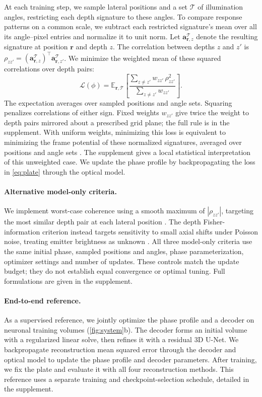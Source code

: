 At each training step, we sample lateral positions and a set $\mathcal T$ of illumination angles, restricting each depth signature to these angles. To compare response patterns on a common scale, we subtract each restricted signature's mean over all its angle--pixel entries and normalize it to unit norm. Let $\mathbf a_{\mathbf r,z}^{\mathcal T}$ denote the resulting signature at position $\mathbf r$ and depth $z$. The correlation between depths $z$ and $z'$ is $\rho_{zz'}=(\mathbf a_{\mathbf r,z}^{\mathcal T})^\top\mathbf a_{\mathbf r,z'}^{\mathcal T}$. We minimize the weighted mean of these squared correlations over depth pairs:
\begin{equation}
\mathcal L(\phi)
=\mathbb E_{\mathbf r,\mathcal T}
\left[\frac{\sum_{z\ne z'}w_{zz'}\,\rho_{zz'}^2}
{\sum_{z\ne z'}w_{zz'}}\right].
\label{eq:plate}
\end{equation}
The expectation averages over sampled positions and angle sets. Squaring penalizes correlations of either sign. Fixed weights $w_{zz'}$ give twice the weight to depth pairs mirrored about a prescribed grid plane; the full rule is in the supplement. With uniform weights, minimizing this loss is equivalent to minimizing the frame potential of these normalized signatures, averaged over positions and angle sets \cite{benedetto2003,duarte2009}. The supplement gives a local statistical interpretation of this unweighted case. We update the phase profile by backpropagating the loss in \cref{eq:plate} through the optical model.

\paragraph{Alternative model-only criteria.}
We implement worst-case coherence using a smooth maximum of $|\rho_{zz'}|$, targeting the most similar depth pair at each lateral position \cite{elad2007}. The depth Fisher-information criterion instead targets sensitivity to small axial shifts under Poisson noise, treating emitter brightness as unknown \cite{shechtman2014}. All three model-only criteria use the same initial phase, sampled positions and angles, phase parameterization, optimizer settings and number of updates. These controls match the update budget; they do not establish equal convergence or optimal tuning. Full formulations are given in the supplement.

\paragraph{End-to-end reference.}
As a supervised reference, we jointly optimize the phase profile and a decoder on neuronal training volumes (\cref{fig:system}b). The decoder forms an initial volume with a regularized linear solve, then refines it with a residual 3D U-Net. We backpropagate reconstruction mean squared error through the decoder and optical model to update the phase profile and decoder parameters. After training, we fix the plate and evaluate it with all four reconstruction methods. This reference uses a separate training and checkpoint-selection schedule, detailed in the supplement.


